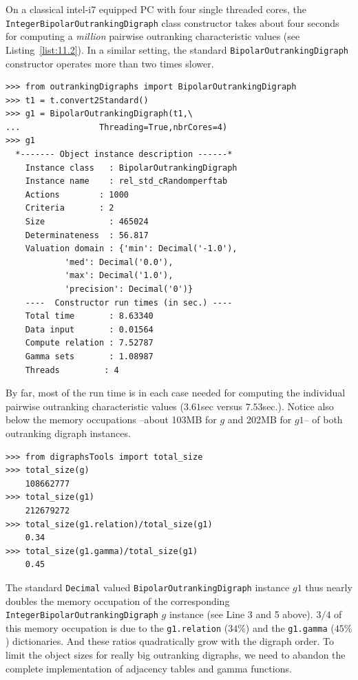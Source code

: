 On a classical intel-i7 equipped PC with four single threaded cores, the \texttt{Inte\-ger\-BipolarOutrankingDigraph} class constructor takes about four seconds for computing a \emph{million} pairwise outranking characteristic values (see Listing~\vref{list:11.2}). In a similar setting, the standard \texttt{BipolarOutranking\-Digraph} constructor operates more than two times slower.
\begin{lstlisting}
>>> from outrankingDigraphs import BipolarOutrankingDigraph
>>> t1 = t.convert2Standard()
>>> g1 = BipolarOutrankingDigraph(t1,\
...                Threading=True,nbrCores=4)
>>> g1
  *------- Object instance description ------*
    Instance class   : BipolarOutrankingDigraph
    Instance name    : rel_std_cRandomperftab
    Actions        : 1000
    Criteria       : 2
    Size             : 465024
    Determinateness  : 56.817
    Valuation domain : {'min': Decimal('-1.0'),
			'med': Decimal('0.0'),
			'max': Decimal('1.0'),
			'precision': Decimal('0')}
    ----  Constructor run times (in sec.) ----
    Total time       : 8.63340
    Data input       : 0.01564
    Compute relation : 7.52787
    Gamma sets       : 1.08987
    Threads         : 4
\end{lstlisting}

By far, most of the run time is in each case needed for computing the individual pairwise outranking characteristic values ($3.61$sec versus $7.53$sec.). Notice also below the memory occupations --about 103MB for $g$ and 202MB for $g1$-- of both outranking digraph instances.
\begin{lstlisting}
>>> from digraphsTools import total_size
>>> total_size(g)
    108662777
>>> total_size(g1)
    212679272
>>> total_size(g1.relation)/total_size(g1)
    0.34
>>> total_size(g1.gamma)/total_size(g1)
    0.45
\end{lstlisting}

The standard \texttt{Decimal} valued
\texttt{BipolarOutrankingDigraph} instance $g1$ thus nearly doubles the memory occupation of the corresponding \texttt{IntegerBipo\-larOutrankingDigraph} $g$ instance (see Line 3 and 5 above). $3/4$ of this memory occupation is due to the \texttt{g1.relation} ($34\%$) and the \texttt{g1.gamma} ($45\%$) dictionaries. And these ratios quadratically grow with the digraph order. To limit the object sizes for really big outranking digraphs, we need to abandon the complete implementation of adjacency tables and gamma functions.

